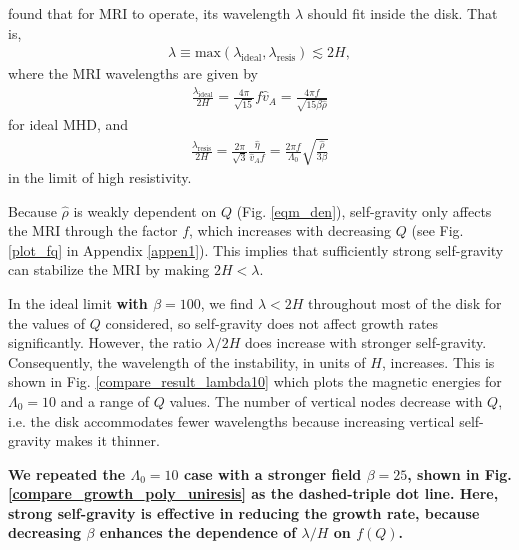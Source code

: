 \cite{sano99} found that for MRI to operate, its 
wavelength $\lambda$ should fit inside the disk. That is,   
\begin{align}\label{sano_crit}
  \lambda \equiv
  \mathrm{max}\left(\lambda_\mathrm{ideal},\lambda_\mathrm{resis}\right)\lesssim
  2H, 
\end{align}
where the MRI wavelengths are given by 
\begin{align}\label{lambda_ideal}
  \frac{\lambda_\mathrm{ideal}}{2H} = \frac{4\pi}{\sqrt{15}} f \hat{v}_A =
  \frac{4\pi f}{\sqrt{15\beta\hat{\rho}}}
\end{align}
for ideal MHD, and 
\begin{align}\label{lambda_resis}
  \frac{\lambda_\mathrm{resis}}{2H} = \frac{2\pi}{\sqrt{3}}\frac{\hat{\eta}}{\hat{v}_A f} =
  \frac{2\pi f}{\Lambda_0}\sqrt{\frac{\hat{\rho}}{3\beta}} 
\end{align}
in the limit of high resistivity.  
   
Because $\hat{\rho}$ is weakly dependent
on $Q$ (Fig. \ref{eqm_den}), self-gravity only affects the
MRI through the factor $f$, which increases with decreasing $Q$ (see
Fig. \ref{plot_fq} in Appendix \ref{appen1}).   
This implies that sufficiently strong self-gravity can stabilize the
MRI by making $ 2H<\lambda $.   
 
In the ideal limit {\bf with $\beta=100$}, we find $\lambda < 2H$
throughout most of the disk for the values of $Q$ considered, so
self-gravity does not affect growth rates significantly. However, the
ratio $\lambda/2H$ does increase with stronger
self-gravity. Consequently, the wavelength of the instability, in
units of $H$, increases. This is shown in
Fig. \ref{compare_result_lambda10} which plots the magnetic energies
for $\Lambda_0=10$ and a range of $Q$ values. The number of vertical 
nodes decrease with $Q$, i.e. the disk accommodates fewer wavelengths
because increasing vertical self-gravity makes it thinner. 

{\bf
We repeated the $\Lambda_0=10$ case with a stronger field $\beta=25$,
shown in Fig. \ref{compare_growth_poly_uniresis} as the dashed-triple
dot line. Here, strong self-gravity is effective in reducing the
growth rate, because decreasing $\beta$ enhances the dependence of
$\lambda/H$ on $f(Q)$. 
} 

